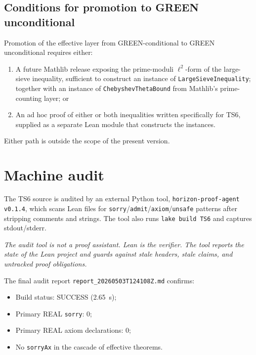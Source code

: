\documentclass[11pt,a4paper]{article}
\theoremstyle{definition}
\begin{document}
\subsection{Conditions for promotion to GREEN unconditional}

Promotion of the effective layer from GREEN-conditional to GREEN unconditional requires either:
\begin{enumerate}[noitemsep]
\item A future Mathlib release exposing the prime-moduli $\ell^2$-form of the large-sieve inequality, sufficient to construct an instance of \verb|LargeSieveInequality|; together with an instance of \verb|ChebyshevThetaBound| from Mathlib's prime-counting layer; or
\item An ad hoc proof of either or both inequalities written specifically for TS6, supplied as a separate Lean module that constructs the instances.
\end{enumerate}
Either path is outside the scope of the present version.

\section{Machine audit}\label{sec:audit}

The TS6 source is audited by an external Python tool, \verb|horizon-proof-agent v0.1.4|, which scans Lean files for \texttt{sorry}/\texttt{admit}/\texttt{axiom}/\texttt{unsafe} patterns after stripping comments and strings. The tool also runs \verb|lake build TS6| and captures stdout/stderr.

\medskip

\noindent\emph{The audit tool is not a proof assistant. Lean is the verifier. The tool reports the state of the Lean project and guards against stale headers, stale claims, and untracked proof obligations.}

\medskip

The final audit report \verb|report_20260503T124108Z.md| confirms:
\begin{itemize}[noitemsep]
\item Build status: SUCCESS (2.65~s);
\item Primary REAL \texttt{sorry}: 0;
\item Primary REAL axiom declarations: 0;
\item No \verb|sorryAx| in the cascade of effective theorems.
\end{itemize}
\end{document}
